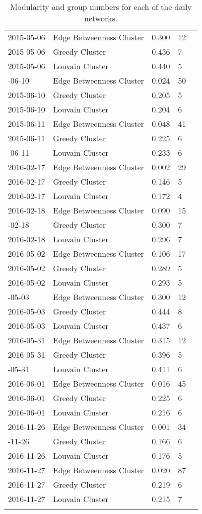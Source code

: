 \documentclass[11pt]{article}
\begin{document}
\begin{longtable}{lllll}
2015-05-06 & Edge Betweenness Cluster & 0.300 & 12\\
2015-05-06 & Greedy Cluster & 0.436 & 7\\
2015-05-06 & Louvain Cluster & 0.440 & 5\\
\addlinespace
2015-06-10 & Edge Betweenness Cluster & 0.024 & 50\\
2015-06-10 & Greedy Cluster & 0.205 & 5\\
2015-06-10 & Louvain Cluster & 0.204 & 6\\
2015-06-11 & Edge Betweenness Cluster & 0.048 & 41\\
2015-06-11 & Greedy Cluster & 0.225 & 6\\
\addlinespace
2015-06-11 & Louvain Cluster & 0.233 & 6\\
2016-02-17 & Edge Betweenness Cluster & 0.002 & 29\\
2016-02-17 & Greedy Cluster & 0.146 & 5\\
2016-02-17 & Louvain Cluster & 0.172 & 4\\
2016-02-18 & Edge Betweenness Cluster & 0.090 & 15\\
\addlinespace
2016-02-18 & Greedy Cluster & 0.300 & 7\\
2016-02-18 & Louvain Cluster & 0.296 & 7\\
2016-05-02 & Edge Betweenness Cluster & 0.106 & 17\\
2016-05-02 & Greedy Cluster & 0.289 & 5\\
2016-05-02 & Louvain Cluster & 0.293 & 5\\
\addlinespace
2016-05-03 & Edge Betweenness Cluster & 0.300 & 12\\
2016-05-03 & Greedy Cluster & 0.444 & 8\\
2016-05-03 & Louvain Cluster & 0.437 & 6\\
2016-05-31 & Edge Betweenness Cluster & 0.315 & 12\\
2016-05-31 & Greedy Cluster & 0.396 & 5\\
\addlinespace
2016-05-31 & Louvain Cluster & 0.411 & 6\\
2016-06-01 & Edge Betweenness Cluster & 0.016 & 45\\
2016-06-01 & Greedy Cluster & 0.225 & 6\\
2016-06-01 & Louvain Cluster & 0.216 & 6\\
2016-11-26 & Edge Betweenness Cluster & 0.001 & 34\\
\addlinespace
2016-11-26 & Greedy Cluster & 0.166 & 6\\
2016-11-26 & Louvain Cluster & 0.176 & 5\\
2016-11-27 & Edge Betweenness Cluster & 0.020 & 87\\
2016-11-27 & Greedy Cluster & 0.219 & 6\\
2016-11-27 & Louvain Cluster & 0.215 & 7\\
\bottomrule
\caption{Modularity and group numbers for each of the daily networks.}
\end{longtable}
\end{document}
